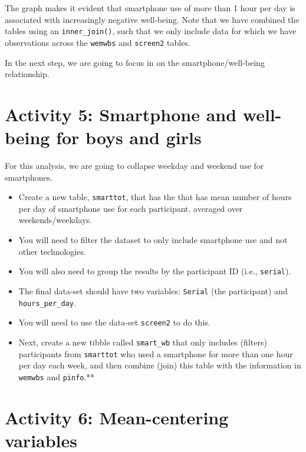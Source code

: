\documentclass[]{book}
\providecommand{\tightlist}{%
  \setlength{\itemsep}{0pt}\setlength{\parskip}{0pt}}
\begin{document}
The graph makes it evident that smartphone use of more than 1 hour per day is associated with increasingly negative well-being. Note that we have combined the tables using an \texttt{inner\_join()}, such that we only include data for which we have observations across the \texttt{wemwbs} and \texttt{screen2} tables.

In the next step, we are going to focus in on the smartphone/well-being relationship.

\hypertarget{activity-5-smartphone-and-well-being-for-boys-and-girls}{%
\section{Activity 5: Smartphone and well-being for boys and girls}\label{activity-5-smartphone-and-well-being-for-boys-and-girls}}

For this analysis, we are going to collapse weekday and weekend use for smartphones.

\begin{itemize}
\tightlist
\item
  Create a new table, \texttt{smarttot}, that has the that has mean number of hours per day of smartphone use for each participant, averaged over weekends/weekdays.
\item
  You will need to filter the dataset to only include smartphone use and not other technologies.
\item
  You will also need to group the results by the participant ID (i.e., \texttt{serial}).
\item
  The final data-set should have two variables: \texttt{Serial} (the participant) and \texttt{hours\_per\_day}.
\item
  You will need to use the data-set \texttt{screen2} to do this.
\end{itemize}

\begin{itemize}
\tightlist
\item
  Next, create a new tibble called \texttt{smart\_wb} that only includes (filters) participants from \texttt{smarttot} who used a smartphone for more than one hour per day each week, and then combine (join) this table with the information in \texttt{wemwbs} and \texttt{pinfo}.**
\end{itemize}

\hypertarget{activity-6-mean-centering-variables}{%
\section{Activity 6: Mean-centering variables}\label{activity-6-mean-centering-variables}}
\end{document}
